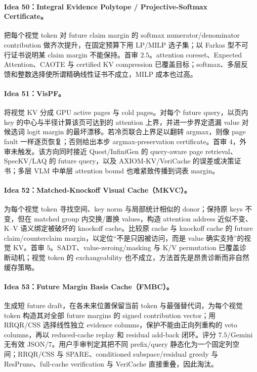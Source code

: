 \documentclass[UTF8,zihao=-4,a4paper]{ctexart}
\begin{document}
\paragraph{Idea 50：Integral Evidence Polytope / Projective-Softmax Certificate。}
把每个视觉 token 对 future claim margin 的 softmax numerator/denominator contribution 做齐次提升，在固定预算下用 LP/MILP 选子集；以 Farkas 型不可行证书说明某 claim margin 不能保持。首审 $2.5$。attention coreset、Expected Attention、CAOTE 与 certified KV compression 已覆盖目标；softmax、多层反馈和整数选择使所谓精确线性证书不成立，MILP 成本也过高。

\paragraph{Idea 51：VisPF。}
将视觉 KV 分成 GPU active pages 与 cold pages。对每个 future query，以页内 key 的中心与半径计算该页可达到的 attention 上界，并进一步界定遗漏 value 对候选词 logit margin 的最坏漂移。若冷页联合上界足以翻转 argmax，则像 page fault 一样逐页恢复；否则给出本步 argmax-preservation certificate。首审 $4$，外审未触发。该方向同时接近 Quest/InfiniGen 的 query-aware page retrieval、SpecKV/LAQ 的 future query，以及 AXIOM-KV/VeriCache 的误差或决策证书；多层 VLM 中单层 attention bound 也难紧致传播到词表 margin。

\paragraph{Idea 52：Matched-Knockoff Visual Cache（MKVC）。}
为每个视觉 token 寻找空间、key norm 与局部统计相似的 donor；保持原 keys 不变，但在 matched group 内交换/置换 values，构造 attention address 近似不变、K--V 语义绑定被破坏的 knockoff cache。比较原 cache 与 knockoff cache 的 future claim/counterclaim margin，以定位“不是只因被访问，而是 value 确实支持”的视觉 KV。首审 $5$。SADT、value-zeroing/masking 与 K/V permutation 已覆盖诊断动机；视觉 token 的 exchangeability 也不成立，方法首先是昂贵诊断而非自然缓存策略。

\paragraph{Idea 53：Future Margin Basis Cache（FMBC）。}
生成短 future draft，在各未来位置保留当前 token 与最强替代词，为每个视觉 token 构造其对全部 future margins 的 signed contribution vector；用 RRQR/CSS 选择线性独立 evidence columns，保护不能由正向列重构的 veto columns，再以 reduced-cache replay 和 residual add-back 闭环。评分 $7.5$/Gemini 无有效 JSON/$7$。用户手审判定其把不同 prefix/query 静态化为一个固定列空间；RRQR/CSS 与 SPARE、conditioned subspace/residual greedy 与 ResPrune、full-cache verification 与 VeriCache 直接重叠，因此淘汰。
\end{document}
